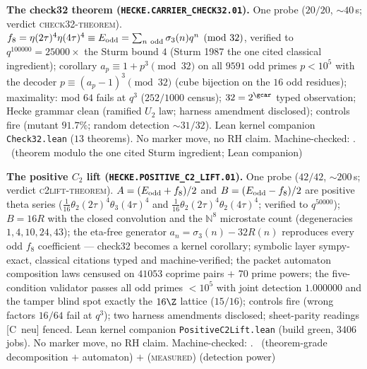 \par\smallskip\noindent\textbf{The check32 theorem
(\texttt{HECKE.CARRIER\_CHECK32.01}).}
One probe ($20/20$, ${\sim}40$\,s; verdict
\textsc{check32-theorem}).  $f_8=\eta(2\tau)^4\eta(4\tau)^4\equiv
E_{\rm odd}=\sum_{n\ \rm odd}\sigma_3(n)q^n\pmod{32}$, verified to
$q^{100000}=25000\times$ the Sturm bound $4$ (Sturm 1987 the one
cited classical ingredient); corollary $a_p\equiv1+p^3\pmod{32}$
on all $9591$ odd primes $p<10^5$ with the decoder
$p\equiv(a_p-1)^3\pmod{32}$ (cube bijection on the $16$ odd
residues); maximality: mod $64$ fails at $q^3$ ($252/1000$
census); $32=2^{\gcar}$ typed observation; Hecke grammar clean
(ramified $U_2$ law; harness amendment disclosed); controls fire
(mutant $91.7\%$; random detection ${\sim}31/32$).  Lean kernel
companion \texttt{Check32.lean} ($13$ theorems).  No marker move,
no RH claim.
Machine-checked: .
\mE\ (theorem modulo the one cited Sturm ingredient; Lean
companion)
\par\smallskip



\par\smallskip\noindent\textbf{The positive $C_2$ lift
(\texttt{HECKE.POSITIVE\_C2\_LIFT.01}).}
One probe ($42/42$, ${\sim}200$\,s; verdict
\textsc{c2lift-theorem}).  $A=(E_{\rm odd}+f_8)/2$ and
$B=(E_{\rm odd}-f_8)/2$ are positive theta series
($\tfrac1{16}\theta_2(2\tau)^4\theta_3(4\tau)^4$ and
$\tfrac1{16}\theta_2(2\tau)^4\theta_2(4\tau)^4$; verified to
$q^{50000}$); $B=16R$ with the closed convolution and the
$\mathbb N^8$ microstate count (degeneracies $1,4,10,24,43$); the
eta-free generator $a_n=\sigma_3(n)-32R(n)$ reproduces every odd
$f_8$ coefficient --- check32 becomes a kernel corollary; symbolic
layer sympy-exact, classical citations typed and machine-verified;
the packet automaton composition laws censused on $41053$ coprime
pairs $+$ $70$ prime powers; the five-condition validator passes
all odd primes $<10^5$ with joint detection $1.000000$ and the
tamper blind spot exactly the $16\Z$ lattice ($15/16$); controls
fire (wrong factors $16/64$ fail at $q^3$); two harness amendments
disclosed; sheet-parity readings [C~neu] fenced.  Lean kernel
companion \texttt{PositiveC2Lift.lean} (build green, $3406$ jobs).
No marker move, no RH claim.
Machine-checked: .
\mE\ (theorem-grade decomposition $+$ automaton) $+$
(\textsc{measured}) (detection power)
\par\smallskip



